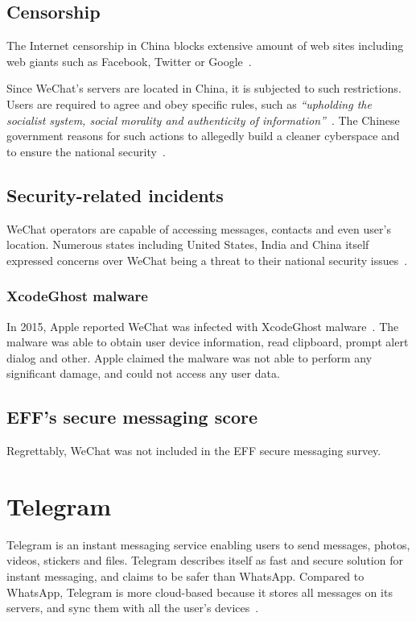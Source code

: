 \documentclass[thesis=M,english]{FITthesis}[2012/10/20]
\begin{document}
\subsection{Censorship}

The Internet censorship in China blocks extensive amount of web sites including web giants such as Facebook, Twitter or Google~\cite{china-twitter,china-facebook}.

Since WeChat's servers are located in China, it is subjected to such restrictions. Users are required to agree and obey specific rules, such as \emph{``upholding the socialist system, social morality and authenticity of information''}~\cite{china-imblocking}. The Chinese government reasons for such actions to allegedly build a cleaner cyberspace and to ensure the national security~\cite{china-blocking2}.

\subsection{Security-related incidents}

WeChat operators are capable of accessing messages, contacts and even user's location. Numerous states including United States, India and China itself expressed concerns over WeChat being a threat to their national security issues~\cite{wechat-states}.

\subsubsection{XcodeGhost malware}

In 2015, Apple reported WeChat was infected with XcodeGhost malware~\cite{wechat-xcodemalware}. The malware was able to obtain user device information, read clipboard, prompt alert dialog and other. Apple claimed the malware was not able to perform any significant damage, and could not access any user data.

\subsection{EFF's secure messaging score}

Regrettably, WeChat was not included in the EFF secure messaging survey.


\section{Telegram}

Telegram is an instant messaging service enabling users to send messages, photos, videos, stickers and files. Telegram describes itself as fast and secure solution for instant messaging, and claims to be safer than WhatsApp. Compared to WhatsApp, Telegram is more cloud-based because it stores all messages on its servers, and sync them with all the user's devices~\cite{telegramfaq}.
\end{document}
